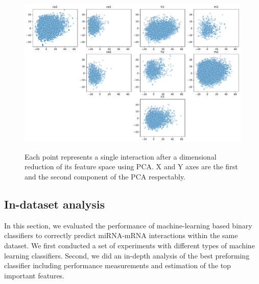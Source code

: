 \documentclass{bmcart}
\begin{document}

\begin{figure}[h!]
  \caption{ Each point represents a single interaction after a dimensional reduction of its feature space using PCA. X and Y axes are the first and the second component of the PCA respectably.}
       \includegraphics[width = 1\textwidth]{Results/features_pca_with_resample.pdf}
      \label{fig:feature_pca}
      \end{figure}


\subsection*{In-dataset analysis} \label{nameref:indataset}
In this section, we evaluated the performance of machine-learning based binary classifiers to correctly predict miRNA-mRNA interactions within the same dataset. 
We first conducted a set of experiments with different types of machine learning classifiers. Second, we did an in-depth analysis of the best preforming classifier including performance measurements and estimation of the top important features.
\end{document}
